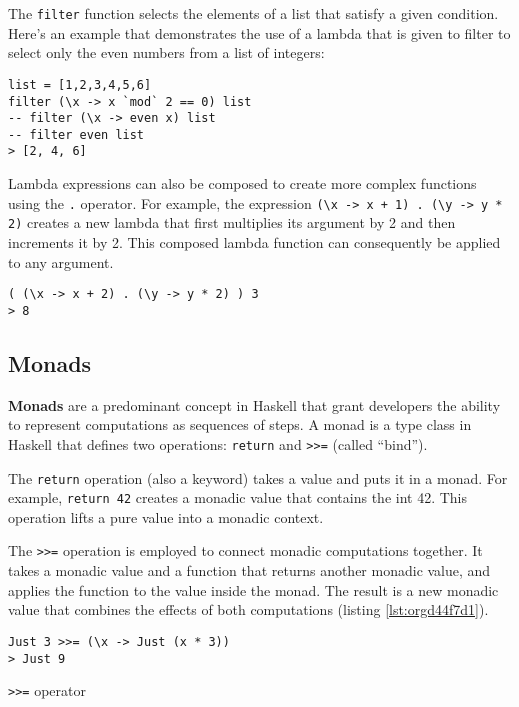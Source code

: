 \documentclass[a4paper, titlepage, twoside]{article}
\begin{document}
The \texttt{filter} function selects the elements of a list that satisfy a given condition. Here's an example that demonstrates the use of a lambda that is given to filter to select only the even numbers from a list of integers:

\begin{verbatim}
list = [1,2,3,4,5,6]
filter (\x -> x `mod` 2 == 0) list
-- filter (\x -> even x) list
-- filter even list
> [2, 4, 6]
\end{verbatim}

Lambda expressions can also be composed to create more complex functions using the \texttt{.} operator. For example, the expression \texttt{(\textbackslash{}x -> x + 1) .  (\textbackslash{}y -> y * 2)} creates a new lambda that first multiplies its argument by 2 and then increments it by 2. This composed lambda function can consequently be applied to any argument.

\begin{verbatim}
( (\x -> x + 2) . (\y -> y * 2) ) 3
> 8
\end{verbatim}

\subsection{Monads}
\label{sec:orgfa1ed0b}

\textbf{Monads} are a predominant concept in Haskell that grant developers the ability to represent computations as sequences of steps. A monad is a type class in Haskell that defines two operations: \texttt{return} and \texttt{>{}>{}=} (called ``bind'').

The \texttt{return} operation (also a keyword) takes a value and puts it in a monad. For example, \texttt{return 42} creates a monadic value that contains the int 42. This operation lifts a pure value into a monadic context.

The \texttt{>{}>{}=} operation is employed to connect monadic computations together. It takes a monadic value and a function that returns another monadic value, and applies the function to the value inside the monad. The result is a new monadic value that combines the effects of both computations (listing \ref{lst:orgd44f7d1}).

\begin{listing}[htbp]
\begin{verbatim}
Just 3 >>= (\x -> Just (x * 3)) 
> Just 9
\end{verbatim}
\caption{\label{lst:orgd44f7d1}\texttt{>{}>{}=} operator}
\end{listing}
\end{document}
